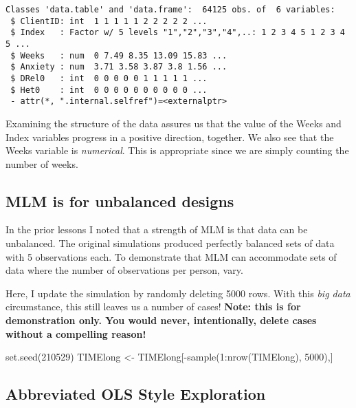 \documentclass[
  11pt,
]{book}
\newenvironment{Shaded}{\begin{snugshade}}{\end{snugshade}}
\newcommand{\DecValTok}[1]{\textcolor[rgb]{0.00,0.00,0.81}{#1}}
\newcommand{\FunctionTok}[1]{\textcolor[rgb]{0.00,0.00,0.00}{#1}}
\newcommand{\NormalTok}[1]{#1}
\newcommand{\OtherTok}[1]{\textcolor[rgb]{0.56,0.35,0.01}{#1}}
\newcommand{\SpecialCharTok}[1]{\textcolor[rgb]{0.00,0.00,0.00}{#1}}
\begin{document}
\begin{verbatim}
Classes 'data.table' and 'data.frame':  64125 obs. of  6 variables:
 $ ClientID: int  1 1 1 1 1 2 2 2 2 2 ...
 $ Index   : Factor w/ 5 levels "1","2","3","4",..: 1 2 3 4 5 1 2 3 4 5 ...
 $ Weeks   : num  0 7.49 8.35 13.09 15.83 ...
 $ Anxiety : num  3.71 3.58 3.87 3.8 1.56 ...
 $ DRel0   : int  0 0 0 0 0 1 1 1 1 1 ...
 $ Het0    : int  0 0 0 0 0 0 0 0 0 0 ...
 - attr(*, ".internal.selfref")=<externalptr> 
\end{verbatim}

Examining the structure of the data assures us that the value of the Weeks and Index variables progress in a positive direction, together. We also see that the Weeks variable is \emph{numerical}. This is appropriate since we are simply counting the number of weeks.

\hypertarget{mlm-is-for-unbalanced-designs}{%
\subsection{MLM is for unbalanced designs}\label{mlm-is-for-unbalanced-designs}}

In the prior lessons I noted that a strength of MLM is that data can be unbalanced. The original simulations produced perfectly balanced sets of data with 5 observations each. To demonstrate that MLM can accommodate sets of data where the number of observations per person, vary.

Here, I update the simulation by randomly deleting 5000 rows. With this \emph{big data} circumstance, this still leaves us a number of cases! \textbf{Note: this is for demonstration only. You would never, intentionally, delete cases without a compelling reason!}

\begin{Shaded}
\begin{Highlighting}[]
\FunctionTok{set.seed}\NormalTok{(}\DecValTok{210529}\NormalTok{)}
\NormalTok{TIMElong }\OtherTok{\textless{}{-}}\NormalTok{ TIMElong[}\SpecialCharTok{{-}}\FunctionTok{sample}\NormalTok{(}\DecValTok{1}\SpecialCharTok{:}\FunctionTok{nrow}\NormalTok{(TIMElong), }\DecValTok{5000}\NormalTok{),]}
\end{Highlighting}
\end{Shaded}

\hypertarget{abbreviated-ols-style-exploration}{%
\subsection{Abbreviated OLS Style Exploration}\label{abbreviated-ols-style-exploration}}
\end{document}

